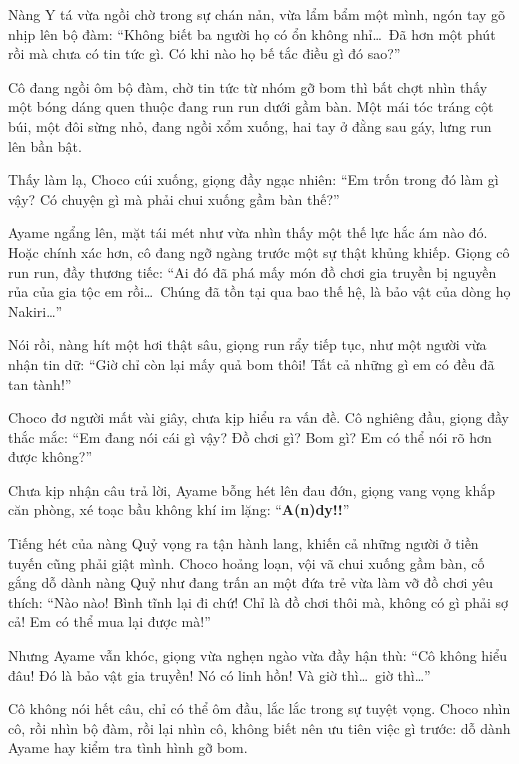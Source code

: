 \documentclass[../main.tex]{subfiles}
\begin{document}
Nàng Y tá vừa ngồi chờ trong sự chán nản, vừa lẩm bẩm một mình, ngón tay gõ nhịp lên bộ đàm: ``Không biết ba người họ có ổn không nhỉ\dots\ Đã hơn một phút rồi mà chưa có tin tức gì. Có khi nào họ bế tắc điều gì đó sao?''

Cô đang ngồi ôm bộ đàm, chờ tin tức từ nhóm gỡ bom thì bất chợt nhìn thấy một bóng dáng quen thuộc đang run run dưới gầm bàn. Một mái tóc tráng cột búi, một đôi sừng nhỏ, đang ngồi xổm xuống, hai tay ở đằng sau gáy, lưng run lên bần bật.


Thấy làm lạ, Choco cúi xuống, giọng đầy ngạc nhiên: ``Em trốn trong đó làm gì vậy? Có chuyện gì mà phải chui xuống gầm bàn thế?''

Ayame ngẩng lên, mặt tái mét như vừa nhìn thấy một thế lực hắc ám nào đó. Hoặc chính xác hơn, cô đang ngỡ ngàng trước một sự thật khủng khiếp. Giọng cô run run, đầy thương tiếc: ``Ai đó đã phá mấy món đồ chơi gia truyền bị nguyền rủa của gia tộc em rồi\dots\ Chúng đã tồn tại qua bao thế hệ, là bảo vật của dòng họ Nakiri\dots''

Nói rồi, nàng hít một hơi thật sâu, giọng run rẩy tiếp tục, như một người vừa nhận tin dữ: ``Giờ chỉ còn lại mấy quả bom thôi! Tất cả những gì em có đều đã tan tành!''

Choco đơ người mất vài giây, chưa kịp hiểu ra vấn đề. Cô nghiêng đầu, giọng đầy thắc mắc: ``Em đang nói cái gì vậy? Đồ chơi gì? Bom gì? Em có thể nói rõ hơn được không?''

Chưa kịp nhận câu trả lời, Ayame bỗng hét lên đau đớn, giọng vang vọng khắp căn phòng, xé toạc bầu không khí im lặng: ``\textbf{A(n)dy!!}''

Tiếng hét của nàng Quỷ vọng ra tận hành lang, khiến cả những người ở tiền tuyến cũng phải giật mình. Choco hoảng loạn, vội vã chui xuống gầm bàn, cố gắng dỗ dành nàng Quỷ như đang trấn an một đứa trẻ vừa làm vỡ đồ chơi yêu thích: ``Nào nào! Bình tĩnh lại đi chứ! Chỉ là đồ chơi thôi mà, không có gì phải sợ cả! Em có thể mua lại được mà!''

Nhưng Ayame vẫn khóc, giọng vừa nghẹn ngào vừa đầy hận thù: ``Cô không hiểu đâu! Đó là bảo vật gia truyền! Nó có linh hồn! Và giờ thì\dots\ giờ thì\dots''

Cô không nói hết câu, chỉ có thể ôm đầu, lắc lắc trong sự tuyệt vọng. Choco nhìn cô, rồi nhìn bộ đàm, rồi lại nhìn cô, không biết nên ưu tiên việc gì trước: dỗ dành Ayame hay kiểm tra tình hình gỡ bom.

\ct
\end{document}
